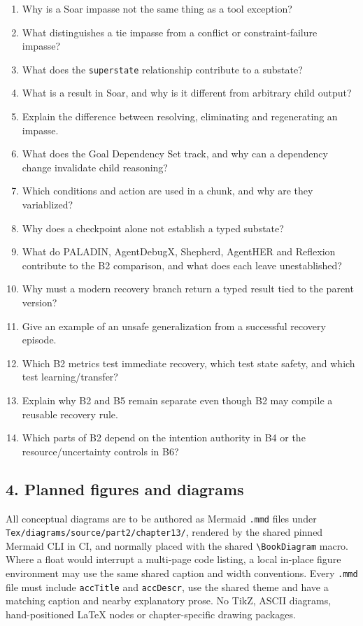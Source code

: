 \begin{enumerate}
\def\labelenumi{\arabic{enumi}.}
\tightlist
\item
  Why is a Soar impasse not the same thing as a tool exception?
\item
  What distinguishes a tie impasse from a conflict or constraint-failure impasse?
\item
  What does the \texttt{superstate} relationship contribute to a substate?
\item
  What is a result in Soar, and why is it different from arbitrary child output?
\item
  Explain the difference between resolving, eliminating and regenerating an impasse.
\item
  What does the Goal Dependency Set track, and why can a dependency change invalidate child reasoning?
\item
  Which conditions and action are used in a chunk, and why are they variablized?
\item
  Why does a checkpoint alone not establish a typed substate?
\item
  What do PALADIN, AgentDebugX, Shepherd, AgentHER and Reflexion contribute to the B2 comparison, and what does each leave unestablished?
\item
  Why must a modern recovery branch return a typed result tied to the parent version?
\item
  Give an example of an unsafe generalization from a successful recovery episode.
\item
  Which B2 metrics test immediate recovery, which test state safety, and which test learning/transfer?
\item
  Explain why B2 and B5 remain separate even though B2 may compile a reusable recovery rule.
\item
  Which parts of B2 depend on the intention authority in B4 or the resource/uncertainty controls in B6?
\end{enumerate}

\subsection{4. Planned figures and diagrams}\label{4-planned-figures-and-diagrams}

All conceptual diagrams are to be authored as Mermaid \texttt{.mmd} files under \texttt{Tex/diagrams/source/part2/chapter13/}, rendered by the shared pinned Mermaid CLI in CI, and normally placed with the shared \texttt{\textbackslash{}BookDiagram} macro. Where a float would interrupt a multi-page code listing, a local in-place figure environment may use the same shared caption and width conventions. Every \texttt{.mmd} file must include \texttt{accTitle} and \texttt{accDescr}, use the shared theme and have a matching caption and nearby explanatory prose. No TikZ, ASCII diagrams, hand-positioned LaTeX nodes or chapter-specific drawing packages.

